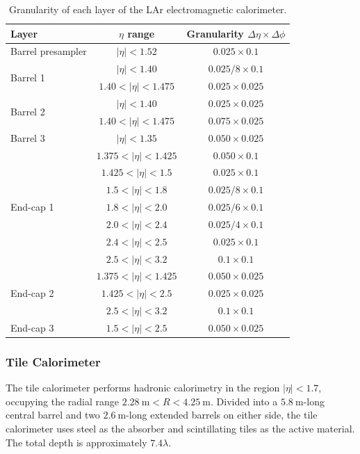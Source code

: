 \begin{table}[htbp]
	\centering
	\begin{tabular}{|l|c|c|}
		\hline
		Layer & $\eta$ range & Granularity $\Delta\eta\times\Delta\phi$ \\
		\hline
		Barrel presampler & $|\eta|<1.52$ & $0.025\times0.1$ \\
		\hline
		\multirow{2}{*}{Barrel 1} & $|\eta|<1.40$ & $0.025 / 8 \times 0.1$ \\
		 & $1.40<|\eta|<1.475$ & $0.025\times0.025$ \\
		\hline
		\multirow{2}{*}{Barrel 2} & $|\eta|<1.40$ & $0.025\times0.025$ \\
		 & $1.40<|\eta|<1.475$ & $0.075\times 0.025$ \\
		\hline
		Barrel 3 & $|\eta|<1.35$ & $0.050\times0.025$ \\
		\hline
		\hline
		\multirow{7}{*}{End-cap 1} & $1.375<|\eta|<1.425$ & $0.050\times0.1$ \\
		 & $1.425<|\eta|<1.5$ & $0.025\times0.1$ \\
		 & $1.5<|\eta|<1.8$ & $0.025/8\times0.1$ \\
		 & $1.8<|\eta|<2.0$ & $0.025/6\times0.1$ \\
		 & $2.0<|\eta|<2.4$ & $0.025/4\times0.1$ \\
		 & $2.4<|\eta|<2.5$ & $0.025\times0.1$ \\
		 & $2.5<|\eta|<3.2$ & $0.1\times0.1$ \\
		\hline
		\multirow{3}{*}{End-cap 2} & $1.375<|\eta|<1.425$ & $0.050\times0.025$ \\
		 & $1.425<|\eta|<2.5$ & $0.025\times0.025$ \\
		 & $2.5<|\eta|<3.2$ & $0.1\times0.1$ \\
		\hline
		End-cap 3 & $1.5<|\eta|<2.5$ & $0.050\times0.025$ \\
		\hline
	\end{tabular}
	\caption{Granularity of each layer of the LAr electromagnetic calorimeter.}
	\label{table:ATLAS-LAr-segmentation}
\end{table}


\subsubsection{Tile Calorimeter}\label{sec:ATLAS-calorimeters-tile}
The tile calorimeter performs hadronic calorimetry in the region $|\eta|<1.7$, occupying the radial range $\SI{2.28}{\meter}<R<\SI{4.25}{\meter}$. Divided into a $\SI{5.8}{\meter}$-long central barrel and two $\SI{2.6}{\meter}$-long extended barrels on either side, the tile calorimeter uses steel as the absorber and scintillating tiles as the active material. The total depth is approximately $7.4\lambda$. 


